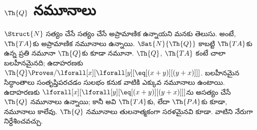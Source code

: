 \documentclass[../../../include/open-logic-section]{subfiles}
\begin{document}
\section{$\Th{Q}$ నమూనాలు}

\begin{explain}
$\Struct{N}$ సత్యం చేసే  సత్యం
చేసే అప్రామాణిక  ఉన్నాయని మనకు
తెలుసు. అంటే, $\Th{TA}$కు అప్రామాణిక నమూనాలు ఉన్నాయి. $\Sat{N}{\Th{Q}}$
కాబట్టి $\Th{TA}$కు ఉన్న ప్రతి నమూనా $\Th{Q}$కు కూడా నమూనా.
$\Th{Q}$, $\Th{TA}$ కంటే చాలా బలహీనమైనది; ఉదాహరణకు
$\Th{Q}\Proves/\lforall[x][\lforall[y][\eq[(x+y)][(y+x)]]]$.
బలహీనమైన సిద్ధాంతాలు సంతృప్తిపరచడం సులభం కనుక వాటికి ఎక్కువ
నమూనాలు ఉంటాయి. ఉదాహరణకు
$\lforall[x][\lforall[y][\eq[(x+y)][(y+x)]]]$ను అసత్యం చేసే
$\Th{Q}$ నమూనాలు ఉన్నాయి; కానీ అవి $\Th{TA}$కు, లేదా
$\Th{PA}$కు కూడా, నమూనాలు కాలేవు. $\Th{Q}$ నమూనాలు తులనాత్మకంగా
సరళమైనవి కూడా. వాటిని నేరుగా నిర్దేశించవచ్చు.
\end{explain}
\end{document}
